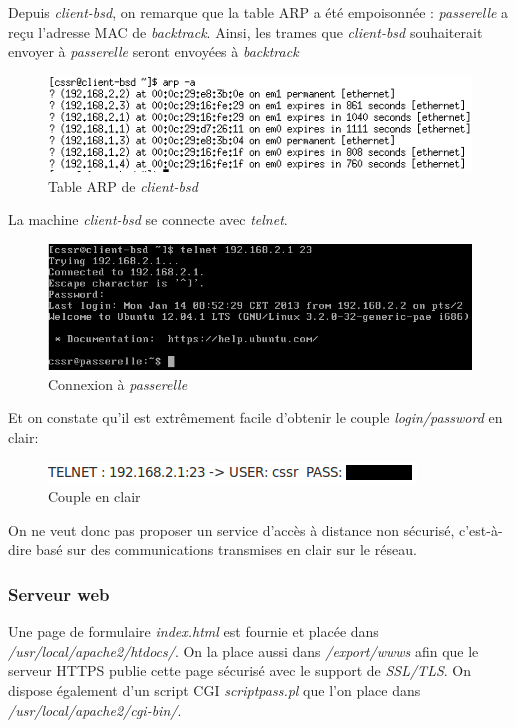 \documentclass[a4paper]{article}
\begin{document}
Depuis \textit{client-bsd}, on remarque que la table ARP a été empoisonnée : 
\textit{passerelle} a reçu l'adresse MAC de \textit{backtrack}.
Ainsi, les trames que \textit{client-bsd} souhaiterait envoyer à \textit{passerelle}
seront envoyées à \textit{backtrack}

\begin{figure}[!ht]
	\centering
	\includegraphics[scale=.4]{MAC2.PNG}
	\caption{\label{arp} Table ARP de \textit{client-bsd}}
\end{figure}

La machine \textit{client-bsd} se connecte avec \textit{telnet}.

\begin{figure}[!ht]
	\centering
	\includegraphics[scale=.5]{Telnet.PNG}
	\caption{\label{hosts} Connexion à \textit{passerelle}}
\end{figure}

Et on constate qu'il est extrêmement facile d'obtenir le couple \textit{login/password} en clair:

\begin{figure}[!ht]
	\centering
	\includegraphics[scale=.5]{Telnet_passwd.png}
	\caption{\label{hosts} Couple en clair}
\end{figure}

On ne veut donc pas proposer un service d'accès à distance non sécurisé, c'est-à-dire
basé sur des communications transmises en clair sur le réseau. 

\subsubsection{Serveur web}
Une page de formulaire \textit{index.html} est fournie et placée dans
\textit{/usr/local/apache2/htdocs/}. On la place aussi dans
\textit{/export/wwws} afin que le serveur HTTPS publie
cette page sécurisé avec le support de \textit{SSL/TLS}.
On dispose également d'un script CGI \textit{scriptpass.pl} que l'on place dans
\textit{/usr/local/apache2/cgi-bin/}.
\end{document}
